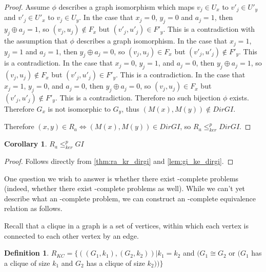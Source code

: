 \documentclass{article}
\newtheorem{corollary}{Corollary}%
\theoremstyle{definition}
\newtheorem{definition}{Definition}%
\newcommand{\kr}{\leq^{p}_{ker}} %
\begin{document}
\begin{proof}
  Assume $\phi$ describes a graph isomorphism which maps $v_j\in U_x$ to
  $v'_j\in U'_y$ and $v'_j\in U'_x$ to $v_j\in U_y$. In the case that $x_j=0$,
  $y_j=0$ and $a_j=1$, then $y_j\oplus a_j=1$, so $(v_j, u_j)\notin F_x$ but
  $(v'_j, u'_j)\in F'_y$. This is a contradiction with the assumption that
  $\phi$ describes a graph isomorphism. In the case that $x_j=1$, $y_j=1$ and
  $a_j=1$, then $y_j\oplus a_j=0$, so $(v_j, u_j)\in F_x$ but $(v'_j,
  u'_j)\notin F'_y$. This is a contradiction. In the case that $x_j=0$,
  $y_j=1$, and $a_j=0$, then $y_j\oplus a_j=1$, so $(v_j, u_j)\notin F_x$ but
  $(v'_j, u'_j)\in F'_y$. This is a contradiction. In the case that $x_j=1$,
  $y_j=0$, and $a_j=0$, then $y_j\oplus a_j=0$, so $(v_j, u_j)\in F_x$ but
  $(v'_j, u'_j)\notin F'_y$. This is a contradiction. Therefore no such
  bijection $\phi$ exists. Therefore $G_x$ is not isomorphic to $G_y$, thus
  $(M(x), M(y))\notin DirGI$.

  Therefore $(x, y)\in R_a\iff (M(x), M(y))\in DirGI$, so $R_a\kr DirGI$.
\end{proof}

\begin{corollary}$R_a\kr GI$\end{corollary}
\begin{proof}Follows directly from \autoref{thm:ra_kr_dirgi} and
  \autoref{lem:gi_ke_dirgi}.\end{proof}

One question we wish to answer is whether there exist \NPEq-complete problems
(indeed, whether there exist \PEq-complete problems as well). While we can't
yet describe what an \NPEq-complete problem, we can construct an \NP-complete
equivalence relation as follows.

Recall that a clique in a graph is a set of vertices, within which each vertex
is connected to each other vertex by an edge.

\begin{definition}
  $R_{KC}=\{((G_1, k_1), (G_2, k_2))| k_1=k_2$ and $(G_1\cong G_2$ or $(G_1$
  has a clique of size $k_1$ and $G_2$ has a clique of size $k_2))\}$
\end{definition}
\end{document}
